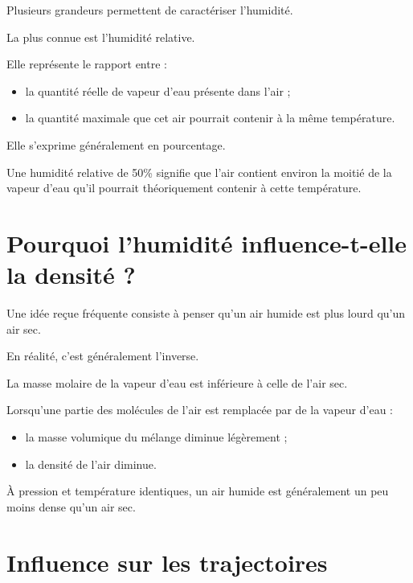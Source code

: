 Plusieurs grandeurs permettent de caractériser l'humidité.

La plus connue est l'humidité relative.

Elle représente le rapport entre :

\begin{itemize}
\item la quantité réelle de vapeur d'eau présente dans l'air ;
\item la quantité maximale que cet air pourrait contenir à la même
température.
\end{itemize}

Elle s'exprime généralement en pourcentage.

\begin{exemple}

Une humidité relative de 50\% signifie que l'air contient environ la moitié
de la vapeur d'eau qu'il pourrait théoriquement contenir à cette température.

\end{exemple}

\section{Pourquoi l'humidité influence-t-elle la densité ?}

Une idée reçue fréquente consiste à penser qu'un air humide est plus lourd
qu'un air sec.

En réalité, c'est généralement l'inverse.

La masse molaire de la vapeur d'eau est inférieure à celle de l'air sec.

Lorsqu'une partie des molécules de l'air est remplacée par de la vapeur
d'eau :

\begin{itemize}
\item la masse volumique du mélange diminue légèrement ;
\item la densité de l'air diminue.
\end{itemize}

\begin{aretenir}

À pression et température identiques, un air humide est généralement un peu
moins dense qu'un air sec.

\end{aretenir}

\section{Influence sur les trajectoires}

